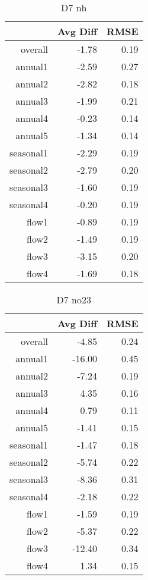 \begin{table}[H]
\centering
\begin{tabular}{rrr}
  \hline
 & Avg Diff & RMSE \\ 
  \hline
overall & -1.78 & 0.19 \\ 
  annual1 & -2.59 & 0.27 \\ 
  annual2 & -2.82 & 0.18 \\ 
  annual3 & -1.99 & 0.21 \\ 
  annual4 & -0.23 & 0.14 \\ 
  annual5 & -1.34 & 0.14 \\ 
  seasonal1 & -2.29 & 0.19 \\ 
  seasonal2 & -2.79 & 0.20 \\ 
  seasonal3 & -1.60 & 0.19 \\ 
  seasonal4 & -0.20 & 0.19 \\ 
  flow1 & -0.89 & 0.19 \\ 
  flow2 & -1.49 & 0.19 \\ 
  flow3 & -3.15 & 0.20 \\ 
  flow4 & -1.69 & 0.18 \\ 
   \hline
\end{tabular}
\caption{D7 nh} 
\end{table}
\begin{table}[H]
\centering
\begin{tabular}{rrr}
  \hline
 & Avg Diff & RMSE \\ 
  \hline
overall & -4.85 & 0.24 \\ 
  annual1 & -16.00 & 0.45 \\ 
  annual2 & -7.24 & 0.19 \\ 
  annual3 & 4.35 & 0.16 \\ 
  annual4 & 0.79 & 0.11 \\ 
  annual5 & -1.41 & 0.15 \\ 
  seasonal1 & -1.47 & 0.18 \\ 
  seasonal2 & -5.74 & 0.22 \\ 
  seasonal3 & -8.36 & 0.31 \\ 
  seasonal4 & -2.18 & 0.22 \\ 
  flow1 & -1.59 & 0.19 \\ 
  flow2 & -5.37 & 0.22 \\ 
  flow3 & -12.40 & 0.34 \\ 
  flow4 & 1.34 & 0.15 \\ 
   \hline
\end{tabular}
\caption{D7 no23} 
\end{table}
